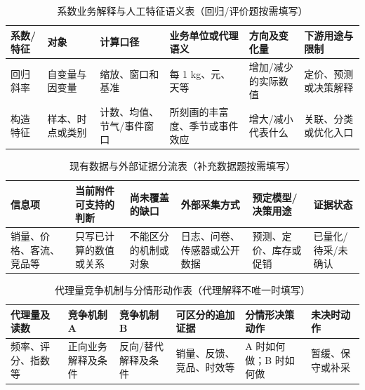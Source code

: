 \documentclass[withoutpreface,bwprint]{cumcmthesis}
\begin{document}
  \begin{table}[H]
    \centering
    \small
    \setlength{\tabcolsep}{3.5pt}
    \caption{系数业务解释与人工特征语义表（回归/评价题按需填写）}
    \label{tab:coefficient-feature-semantics-guide}
    \begin{tabular}{p{1.65cm}p{1.75cm}p{1.9cm}p{2.4cm}p{2.15cm}p{2.45cm}}
      \toprule
      系数/特征 & 对象 & 计算口径 & 业务单位或代理语义 & 方向及变化量 & 下游用途与限制 \\
      \midrule
      回归斜率 & 自变量与因变量 & 缩放、窗口和基准 & 每 1 kg、元、天等 & 增加/减少的实际数值 & 定价、预测或决策解释 \\
      构造特征 & 样本、时点或类别 & 计数、均值、节气/事件窗口 & 所刻画的丰富度、季节或事件效应 & 增大/减小代表什么 & 关联、分类或优化入口 \\
      \bottomrule
    \end{tabular}
  \end{table}
  \begin{table}[H]
    \centering
    \small
    \setlength{\tabcolsep}{3.5pt}
    \caption{现有数据与外部证据分流表（补充数据题按需填写）}
    \label{tab:current-external-evidence-guide}
    \begin{tabular}{p{2.0cm}p{2.65cm}p{2.35cm}p{2.25cm}p{2.25cm}p{1.8cm}}
      \toprule
      信息项 & 当前附件可支持的判断 & 尚未覆盖的缺口 & 外部采集方式 & 预定模型/决策用途 & 证据状态 \\
      \midrule
      销量、价格、客流、竞品等 & 只写已计算的数值或关系 & 不能区分的机制或对象 & 日志、问卷、传感器或公开数据 & 预测、定价、库存或促销 & 已量化/待采/未确认 \\
      \bottomrule
    \end{tabular}
  \end{table}
  \begin{table}[H]
    \centering
    \small
    \setlength{\tabcolsep}{3.5pt}
    \caption{代理量竞争机制与分情形动作表（代理解释不唯一时填写）}
    \label{tab:proxy-competing-mechanism-guide}
    \begin{tabular}{p{1.75cm}p{2.3cm}p{2.3cm}p{2.65cm}p{2.45cm}p{1.85cm}}
      \toprule
      代理量及读数 & 竞争机制 A & 竞争机制 B & 可区分的追加证据 & 分情形决策动作 & 未决时动作 \\
      \midrule
      频率、评分、指数等 & 正向业务解释及条件 & 反向/替代解释及条件 & 销量、反馈、竞品、时效等 & A 时如何做；B 时如何做 & 暂缓、保守或补采 \\
      \bottomrule
    \end{tabular}
  \end{table}
\end{document}
